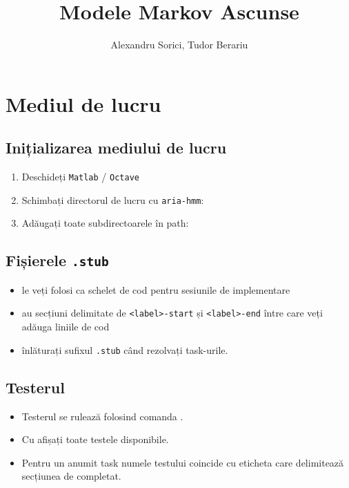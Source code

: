 \documentclass[12pt]{article}
\title{Modele Markov Ascunse}
\author{Alexandru Sorici, Tudor Berariu}
\institute{Asociația Română pentru Inteligență Artificială}
\begin{document}
\mytitlepage
\tableofcontents
\clearpage
\section{Mediul de lucru}
\label{sec:framework}

\subsection{Inițializarea mediului de lucru}
\label{sec:init}

\begin{enumerate}
\item Deschideți \texttt{Matlab} / \texttt{Octave}
\item Schimbați directorul de lucru cu \texttt{aria-hmm}:\\
\item Adăugați toate subdirectoarele în path:\\
\end{enumerate}

\subsection{Fișierele \texttt{.stub}}
\label{sec:stubs}

\begin{itemize}
\item le veți folosi ca schelet de cod pentru sesiunile de implementare
\item au secțiuni delimitate de \texttt{<label>-start} și \texttt{<label>-end}
  între care veți adăuga liniile de cod
\item înlăturați sufixul \texttt{.stub} când rezolvați task-urile.
\end{itemize}


\subsection{Testerul}
\label{sec:tester}

\begin{itemize}
\item Testerul se rulează folosind comanda .
  
\item Cu  afișați toate testele disponibile.
\item Pentru un anumit task numele testului coincide cu eticheta care delimitează secțiunea de completat.
\end{itemize}
\end{document}
